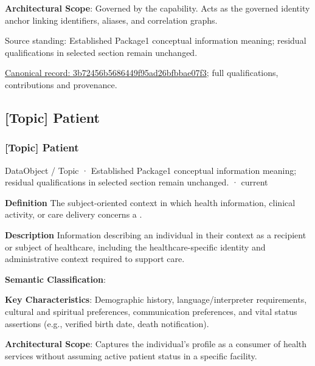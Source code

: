 \textbf{Architectural Scope}: Governed by the \texttt{} capability. Acts as the governed identity anchor linking identifiers, aliases, and correlation graphs.



Source standing: Established Package1 conceptual information meaning; residual qualifications in selected section remain unchanged.


{\footnotesize \href{../../../../continuum/application/data-object/topic/3b72456b5686449f95ad26bfbbae07f3.md}{Canonical record: 3b72456b5686449f95ad26bfbbae07f3}; full qualifications, contributions and provenance.}\par
\subsection{[Topic] Patient}

\subsubsection{[Topic] Patient}

\label{element:e92ea15616ea43c9a1d698e34ed1376b}
{\small DataObject / Topic · Established Package1 conceptual information meaning; residual qualifications in selected section remain unchanged. · current}\par

\textbf{Definition} 
The subject-oriented context in which health information, clinical activity, or care delivery concerns a \texttt{}.



\textbf{Description} 
Information describing an individual in their context as a recipient or subject of healthcare, including the healthcare-specific identity and administrative context required to support care.



\textbf{Semantic Classification}: \texttt{}



\textbf{Key Characteristics}: Demographic history, language/interpreter requirements, cultural and spiritual preferences, communication preferences, and vital status assertions (e.g., verified birth date, death notification).



\textbf{Architectural Scope}: Captures the individual's profile as a consumer of health services without assuming active patient status in a specific facility.



